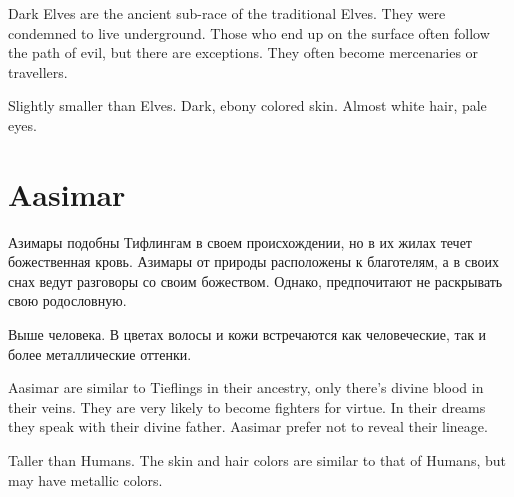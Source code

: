 \documentclass[a5paper,11pt]{book}
\begin{document}
\begin{multicols}{2}
\begin{en}
  Dark Elves are the ancient sub-race of the traditional Elves. They were condemned to live underground. Those who end up on the surface often follow the path of evil, but there are exceptions. They often become mercenaries or travellers.

Slightly smaller than Elves. Dark, ebony colored skin. Almost white hair, pale eyes.
\end{en}

\section{Aasimar}
\begin{ru}
Азимары подобны Тифлингам в своем происхождении, но в их жилах течет божественная кровь.  Азимары от природы расположены к благотелям, а в своих снах ведут разговоры со своим божеством. Однако, предпочитают не раскрывать свою родословную.

Выше человека. В цветах волосы и кожи встречаются как человеческие, так и более металлические оттенки.
\end{ru}

\begin{en}
  Aasimar are similar to Tieflings in their ancestry, only there's divine blood in their veins. They are very likely to become fighters for virtue. In their dreams they speak with their divine father. Aasimar prefer not to reveal their lineage.


Taller than Humans. The skin and hair colors are similar to that of Humans, but may have metallic colors.
\end{en}
\end{multicols}

\end{document}

